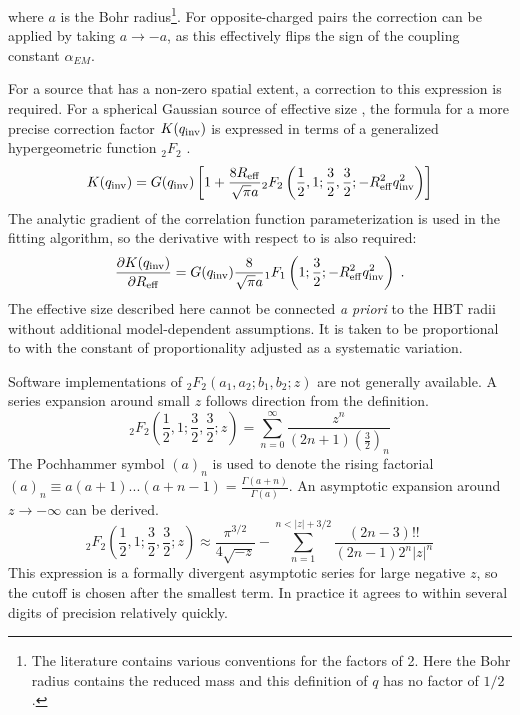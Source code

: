 where $a$ is the Bohr radius\footnote{The literature contains various conventions for the factors of 2.
Here the Bohr radius contains the reduced mass and this definition of $q$ has no factor of $1/2$.}.
For opposite-charged pairs the correction can be applied by taking $a \to -a$, as this effectively flips the sign of the coupling constant $\alpha_{EM}$.

For a source that has a non-zero spatial extent, a correction to this expression is required.
For a spherical Gaussian source of effective size \Reff, the formula for a more precise correction factor $K(q_{\mathrm{inv}})$ is expressed in terms of a generalized hypergeometric function ${}_2 F_2$ \cite{Maj:2009ue}.
\begin{equation}
  K(q_{\mathrm{inv}}) = G(q_{\mathrm{inv}}) \left[ 1 + \frac{8R_{\mathrm{eff}}}{\sqrt{\pi}a} {}_2 F_2 \left( \frac{1}{2}, 1; \frac{3}{2}, \frac{3}{2}; -R_{\mathrm{eff}}^2 q_{\mathrm{inv}}^2 \right) \right]
\end{equation}
The analytic gradient of the correlation function parameterization is used in the fitting algorithm, so the derivative with respect to \Reff is also required:
\begin{equation}
  \frac{\partial K(q_{\mathrm{inv}})}{\partial R_{\mathrm{eff}}} = G(q_{\mathrm{inv}}) \frac{8}{\sqrt{\pi}a} {}_1 F_1 \left( 1; \frac{3}{2}; -R_{\mathrm{eff}}^2 q_{\mathrm{inv}}^2 \right) \; .
\end{equation}
The effective size \Reff described here cannot be connected \emph{a priori} to the HBT radii without additional model-dependent assumptions.
It is taken to be proportional to \Rinv with the constant of proportionality adjusted as a systematic variation.

Software implementations of ${}_2F_2 (a_1, a_2; b_1, b_2; z)$ are not generally available.
A series expansion around small $z$ follows direction from the definition.
\begin{equation} {}_2F_2 \left( \frac{1}{2}, 1; \frac{3}{2}, \frac{3}{2}; z \right) = \sum_{n=0}^{\infty} \frac{z^n}{(2n+1) \left(\frac{3}{2}\right)_n} \end{equation}
The Pochhammer symbol $(a)_n$ is used to denote the rising factorial \((a)_n \equiv a(a+1)...(a+n-1) = \frac{\Gamma(a+n)}{\Gamma(a)} \).
An asymptotic expansion around $z \to - \infty$ can be derived.
\begin{equation} {}_2F_2 \left( \frac{1}{2}, 1; \frac{3}{2}, \frac{3}{2}; z \right) \approx \frac{\pi^{3/2}}{4\sqrt{-z}} - \sum_{n=1}^{n < |z| + 3/2} \frac{(2n-3)!!}{(2n-1) 2^n |z|^n}  \end{equation}
This expression is a formally divergent asymptotic series for large negative $z$, so the cutoff is chosen after the smallest term.
In practice it agrees to within several digits of precision relatively quickly.

